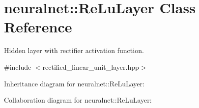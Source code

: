 \hypertarget{classneuralnet_1_1ReLuLayer}{}\section{neuralnet\+:\+:Re\+Lu\+Layer Class Reference}
\label{classneuralnet_1_1ReLuLayer}


Hidden layer with rectifier activation function.  




{\ttfamily \#include $<$rectified\+\_\+linear\+\_\+unit\+\_\+layer.\+hpp$>$}



Inheritance diagram for neuralnet\+:\+:Re\+Lu\+Layer\+:


Collaboration diagram for neuralnet\+:\+:Re\+Lu\+Layer\+:
